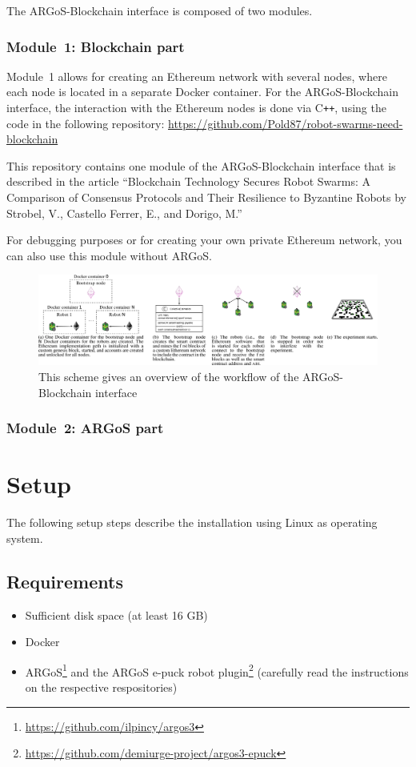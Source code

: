 \documentclass{article}
\begin{document}
The ARGoS-Blockchain interface is composed of two modules. 

\subsubsection{Module~1: Blockchain part}
Module~1 allows for creating an Ethereum network with several nodes,
where each node is located in a separate Docker container. For the
ARGoS-Blockchain interface, the interaction with the Ethereum nodes is
done via C\texttt{++}, using the code in the following repository:
\url{https://github.com/Pold87/robot-swarms-need-blockchain}

This repository contains one module of the ARGoS-Blockchain interface
that is described in the article ``Blockchain Technology Secures Robot
Swarms: A Comparison of Consensus Protocols and Their Resilience to
Byzantine Robots by Strobel, V., Castello Ferrer, E., and Dorigo, M.''

For debugging purposes or for creating your own private Ethereum
network, you can also use this module without ARGoS.

\begin{figure}[t]
  \centering
  \includegraphics{interface}
  \caption[Overview of the ARGoS-Blockchain interface]{This scheme
    gives an overview of the workflow of the ARGoS-Blockchain
    interface}
  \label{fig:interface}
\end{figure}

\subsubsection{Module~2: ARGoS part}

\section{Setup}

The following setup steps describe the installation using Linux as
operating system.

\subsection{Requirements}
\begin{itemize}
\item Sufficient disk space (at least 16 GB)
\item Docker 
\item ARGoS\footnote{\url{https://github.com/ilpincy/argos3}} and the
  ARGoS e-puck robot
  plugin\footnote{\url{https://github.com/demiurge-project/argos3-epuck}}
  (carefully read the instructions on the respective respositories)
\end{itemize}
\end{document}
